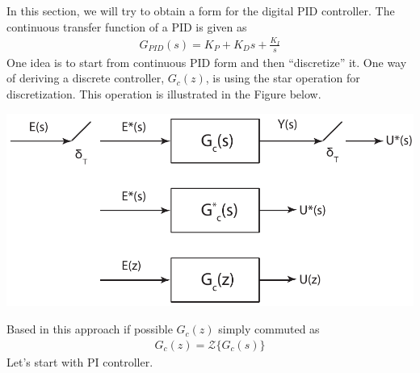 \documentclass[twoside]{article}
\begin{document}
In this section, we will try to obtain a form for the digital PID
controller. The continuous transfer function of a PID is given as
%
\begin{align*}
G_{PID}(s) = K_P + K_D s + \frac{K_I}{s}
\end{align*}
% 
One idea is to start from continuous PID form and then ``discretize''
it. One way of deriving a discrete controller, $G_{c}(z)$, is using
the star operation for discretization. This operation is illustrated 
in the Figure below.
%
    \begin{center}
\begin{minipage}[h]{0.6\linewidth}
    \begin{center}
      \includegraphics[width=\textwidth]{discrete_controller}
    \end{center}
\end{minipage}
    \end{center}
%
Based in this approach if possible $G_c(z)$ simply commuted as
%
\begin{align*}
  G_c(z) = \mathcal{Z} \lbrace G_c(s) \rbrace
\end{align*}
%
Let's start with PI controller. 
\end{document}
